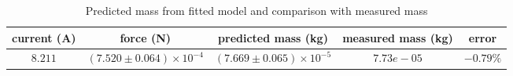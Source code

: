 \begin{table}[htb!]
\centering
\caption{Predicted mass from fitted model and comparison with measured mass}
\begin{tabular}{ccccc}
\toprule
current (\unit{\A}) & force (\unit{\N}) & predicted mass (\unit{\kg}) & measured mass (\unit{\kg}) & error \\
\midrule
$8.211$ & $(7.520 \pm 0.064)\times 10^{-4}$ & $(7.669 \pm 0.065)\times 10^{-5}$ & $7.73e-05$ & $-0.79\%$ \\
\bottomrule
\end{tabular}
\end{table}
